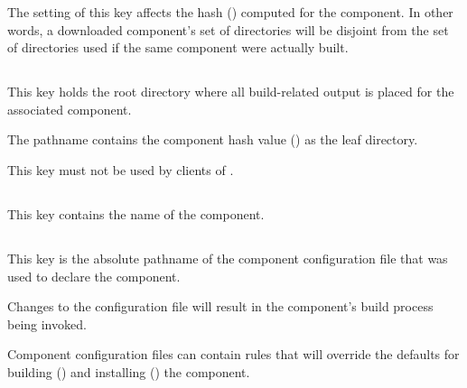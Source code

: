 The setting of this key affects the hash ()
computed for the component.  In other words, a downloaded component's
set of directories will be disjoint from the set of directories used
if the same component were actually built.


\subsection{}\label{variables:build-root-directory}

This key holds the root directory where all build-related output is
placed for the associated component.

The pathname contains the component hash value ()
as the leaf directory.

This key must not be used by clients of \lmsbw.


\subsection{}\label{variables:component}

This key contains the name of the component.


\subsection{}\label{variables:configuration-file}

This key is the absolute pathname of the component configuration file
that was used to declare the component.

Changes to the configuration file will result in the component's build
process being invoked.

Component configuration files can contain \makefile rules that will
override the defaults for building
() and installing
() the component.


\subsection{}\label{variables:description}


